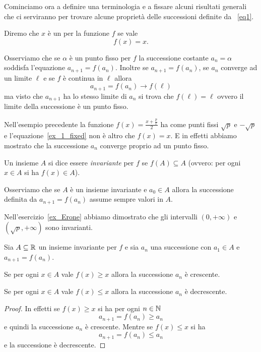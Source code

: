Cominciamo ora a definire una terminologia e a fissare alcuni
risultati generali che ci serviranno per trovare alcune proprietà
delle successioni definite da~ \eqref{eq1}.

\begin{definition}
\mymark{**}%
  Diremo che $x$ è un 
  per la funzione $f$ se vale
  \[
    f(x) = x.
  \]
\end{definition}
Osserviamo che se $\alpha$ è un punto fisso per $f$ la successione costante
$a_n=\alpha$ soddisfa l'equazione $a_{n+1} = f(a_n)$. Inoltre se
$a_{n+1} = f(a_n)$, se $a_n$ converge ad un limite $\ell$ e se
$f$ è continua in $\ell$ allora
\[
a_{n+1} = f(a_n) \to f(\ell)
\]
ma visto che $a_{n+1}$ ha lo stesso limite di $a_n$ si trova che
$f(\ell)=\ell$ ovvero il limite della successione è un punto fisso.

Nell'esempio precedente la funzione $f(x) = \frac{x+\frac p x}2$ ha come punti
fissi $\sqrt{p}$ e $-\sqrt{p}$ e l'equazione~\eqref{ex_1_fixed} non è
altro che $f(x)=x$. E in effetti abbiamo mostrato che la successione
$a_n$ converge proprio ad un punto fisso.

\begin{definition}
\mymark{**}%
  Un insieme $A$ si dice essere \emph{invariante}
  per $f$ se
  $f(A)\subseteq A$
  (ovvero: per ogni $x\in A$ si ha $f(x)\in A$).
\end{definition}

Osserviamo che se $A$ è un insieme invariante e $a_0\in A$ allora la
successione definita da $a_{n+1}=f(a_n)$ assume sempre valori in $A$.

Nell'esercizio~\ref{ex_Erone} abbiamo dimostrato che gli intervalli
$(0,+\infty)$ e $(\sqrt{p},+\infty)$ sono invarianti.

\begin{theorem}\label{th_1}
\mymark{*}%
  Sia $A\subseteq {\mathbb R}$ un insieme invariante per $f$ e sia $a_n$ una
  successione con $a_1 \in A$ e $a_{n+1}=f(a_n)$.

  Se per ogni $x\in A$
  vale $f(x) \ge x$
  allora la successione $a_n$ è crescente.

  Se per ogni $x\in A$ vale $f(x) \le x$
  allora la successione $a_n$ è decrescente.
\end{theorem}
\begin{proof}
\mymark{*}%
  In effetti se $f(x) \ge x$ si ha per ogni $n\in {\mathbb N}$
  \[
  a_{n+1} = f(a_n) \ge a_n
  \]
e quindi la successione $a_n$ è crescente. Mentre se $f(x) \le x$ si ha
  \[
  a_{n+1} = f(a_n) \le a_n
  \]
e la successione è decrescente.
\end{proof}

